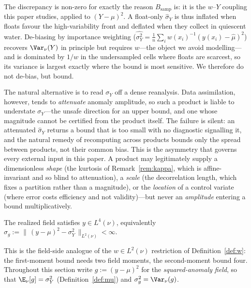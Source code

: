 The discrepancy is non-zero for exactly the reason $B_{\mathrm{samp}}$
is: it is the $w$--$Y$ coupling this paper studies, applied to
$(Y-\mu)^2$. A float-only $\hat\sigma_Y$ is thus inflated when floats
favour the high-variability front and deflated when they collect in
quiescent water. De-biasing by importance weighting
($\widehat{\sigma_Y^2}=\frac1n\sum_i w(x_i)^{-1}(y(x_i)-\hat\mu)^2$)
recovers $\Var_\nu(Y)$ in principle but requires $w$---the object we
avoid modelling---and is dominated by $1/w$ in the undersampled cells
where floats are scarcest, so its variance is largest exactly where the
bound is most sensitive. We therefore do not de-bias, but bound.

\begin{remark}
\label{rem:conservative-Y}
The natural alternative is to read $\sigma_Y$ off a dense reanalysis.
Data assimilation, however, tends to \emph{attenuate} anomaly amplitude,
so such a product is liable to understate $\sigma_Y$---the unsafe
direction for an upper bound, and one whose magnitude cannot be
certified from the product itself. The failure is silent: an attenuated
$\hat\sigma_Y$ returns a bound that is too small with no diagnostic
signalling it, and the natural remedy of recomputing across products
bounds only the spread between products, not their common bias. This is
the asymmetry that governs every external input in this paper. A product
may legitimately supply a dimensionless \emph{shape} (the kurtosis of
Remark~\ref{rem:kappa}, which is affine-invariant and so blind to
attenuation), a \emph{scale} (the decorrelation length, which fixes a
partition rather than a
magnitude), or the \emph{location} of a control variate
(where error costs efficiency and not
validity)---but never an \emph{amplitude} entering a bound
multiplicatively.
\end{remark}

\begin{assumption}
\label{ass:l4}
The realized field satisfies $y\in L^4(\nu)$, equivalently
$\sigma_g:=\big\|\,(y-\mu)^2-\sigma_Y^2\,\big\|_{L^2(\nu)}<\infty$.
\end{assumption}

This is the field-side analogue of the $w\in L^2(\nu)$ restriction of
Definition~\ref{def:w}: the first-moment bound needs two field moments,
the second-moment bound four. Throughout this section write
$g:=(y-\mu)^2$ for the \emph{squared-anomaly field}, so that
$\E_\nu[g]=\sigma_Y^2$ (Definition~\ref{def:mu}) and
$\sigma_g^2=\Var_\nu(g)$.

